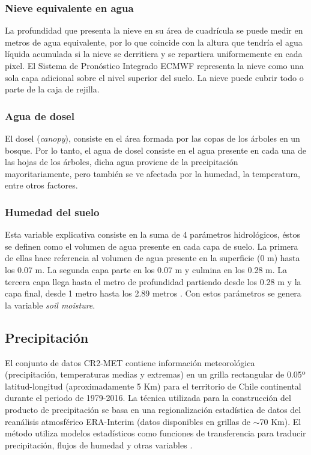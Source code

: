     \subsubsection{Nieve equivalente en agua}
    La profundidad que presenta la nieve en su área de cuadrícula se puede medir en metros de agua equivalente, por lo que coincide con la altura que tendría el agua líquida acumulada si la nieve se derritiera y se 
    repartiera uniformemente en cada pixel. El Sistema de Pronóstico Integrado ECMWF representa la nieve como una sola capa adicional sobre el nivel superior del suelo. La nieve puede cubrir todo o parte de la caja de rejilla.

    \subsubsection{Agua de dosel}
    El dosel (\textit{canopy}), consiste en el área formada por las copas de los árboles en un bosque. Por lo tanto, el agua de dosel consiste en el agua presente en cada una de las hojas de los árboles, dicha agua proviene de 
    la precipitación mayoritariamente, pero también se ve afectada por la humedad, la temperatura, entre otros factores.

    \subsubsection{Humedad del suelo}
    Esta variable explicativa consiste en la suma de 4 parámetros hidrológicos, éstos se definen como el volumen de agua presente en cada capa de suelo. La primera de ellas
    hace referencia al volumen de agua presente en la superficie (0 m) hasta los 0.07 m. La segunda capa parte en los 0.07 m y culmina en los 0.28 m. La tercera capa llega hasta el metro de profundidad partiendo desde los 0.28 m
    y la capa final, desde 1 metro hasta los 2.89 metros \cite{ERA5-L_doc}. Con estos parámetros se genera la variable \textit{soil moisture}.

    \subsection{Precipitación}
    El conjunto de datos CR2-MET contiene información meteorológica (precipitación, temperaturas medias y extremas) en un grilla rectangular de 0.05º latitud-longitud (aproximadamente 5 Km) para el territorio de Chile continental 
    durante el periodo de 1979-2016. La técnica utilizada para la construcción del producto de precipitación se basa en una regionalización estadística de datos del reanálisis atmosférico ERA-Interim (datos disponibles en grillas de $\sim$70 Km). 
    El método utiliza modelos estadísticos como funciones de transferencia para traducir precipitación, flujos de humedad y otras variables \cite{pr}.
    
